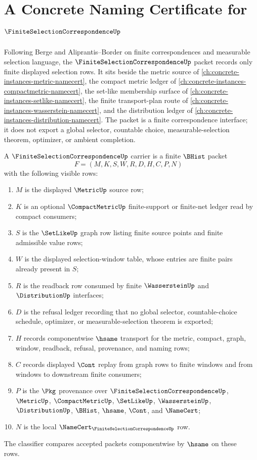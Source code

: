 \chapter{A Concrete Naming Certificate for $\FiniteSelectionCorrespondenceUp$}
\label{ch:concrete-instances-finite-selection-correspondence-namecert}

Following Berge and Aliprantis--Border on finite correspondences and measurable selection language, the $\FiniteSelectionCorrespondenceUp$ packet records only finite displayed selection rows. It sits beside the metric source of \autoref{ch:concrete-instances-metric-namecert}, the compact metric ledger of \autoref{ch:concrete-instances-compactmetric-namecert}, the set-like membership surface of \autoref{ch:concrete-instances-setlike-namecert}, the finite transport-plan route of \autoref{ch:concrete-instances-wasserstein-namecert}, and the distribution ledger of \autoref{ch:concrete-instances-distribution-namecert}. The packet is a finite correspondence interface; it does not export a global selector, countable choice, measurable-selection theorem, optimizer, or ambient completion.

\begin{definition}
\label{def:finite-selection-correspondence-carrier}
A $\FiniteSelectionCorrespondenceUp$ carrier is a finite $\BHist$ packet
$$
F=(M,K,S,W,R,D,H,C,P,N)
$$
with the following visible rows:
\begin{enumerate}
\item $M$ is the displayed $\MetricUp$ source row;
\item $K$ is an optional $\CompactMetricUp$ finite-support or finite-net ledger read by compact consumers;
\item $S$ is the $\SetLikeUp$ graph row listing finite source points and finite admissible value rows;
\item $W$ is the displayed selection-window table, whose entries are finite pairs already present in $S$;
\item $R$ is the readback row consumed by finite $\WassersteinUp$ and $\DistributionUp$ interfaces;
\item $D$ is the refusal ledger recording that no global selector, countable-choice schedule, optimizer, or measurable-selection theorem is exported;
\item $H$ records componentwise $\hsame$ transport for the metric, compact, graph, window, readback, refusal, provenance, and naming rows;
\item $C$ records displayed $\Cont$ replay from graph rows to finite windows and from windows to downstream finite consumers;
\item $P$ is the $\Pkg$ provenance over $\FiniteSelectionCorrespondenceUp$, $\MetricUp$, $\CompactMetricUp$, $\SetLikeUp$, $\WassersteinUp$, $\DistributionUp$, $\BHist$, $\hsame$, $\Cont$, and $\NameCert$;
\item $N$ is the local $\NameCert_{\FiniteSelectionCorrespondenceUp}$ row.
\end{enumerate}
The classifier compares accepted packets componentwise by $\hsame$ on these rows.
\end{definition}

